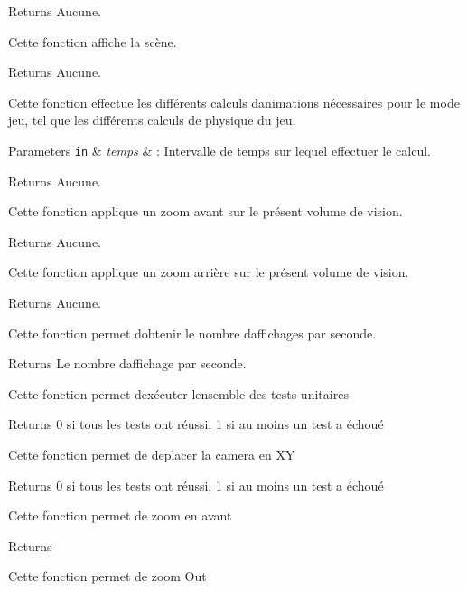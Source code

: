 \begin{DoxyReturn}{Returns}
Aucune.
\end{DoxyReturn}
Cette fonction affiche la scène.

\begin{DoxyReturn}{Returns}
Aucune.
\end{DoxyReturn}
Cette fonction effectue les différents calculs d\textquotesingle{}animations nécessaires pour le mode jeu, tel que les différents calculs de physique du jeu.


\begin{DoxyParams}[1]{Parameters}
\mbox{\tt in}  & {\em temps} & \+: Intervalle de temps sur lequel effectuer le calcul.\\
\hline
\end{DoxyParams}
\begin{DoxyReturn}{Returns}
Aucune.
\end{DoxyReturn}
Cette fonction applique un zoom avant sur le présent volume de vision.

\begin{DoxyReturn}{Returns}
Aucune.
\end{DoxyReturn}
Cette fonction applique un zoom arrière sur le présent volume de vision.

\begin{DoxyReturn}{Returns}
Aucune.
\end{DoxyReturn}
Cette fonction permet d\textquotesingle{}obtenir le nombre d\textquotesingle{}affichages par seconde.

\begin{DoxyReturn}{Returns}
Le nombre d\textquotesingle{}affichage par seconde.
\end{DoxyReturn}
Cette fonction permet d\textquotesingle{}exécuter l\textquotesingle{}ensemble des tests unitaires

\begin{DoxyReturn}{Returns}
0 si tous les tests ont réussi, 1 si au moins un test a échoué
\end{DoxyReturn}
Cette fonction permet de deplacer la camera en X\+Y

\begin{DoxyReturn}{Returns}
0 si tous les tests ont réussi, 1 si au moins un test a échoué
\end{DoxyReturn}
Cette fonction permet de zoom en avant

\begin{DoxyReturn}{Returns}

\end{DoxyReturn}
Cette fonction permet de zoom Out

